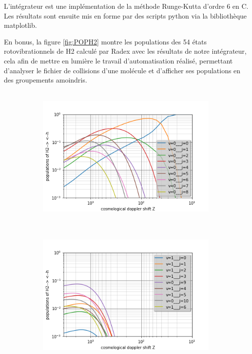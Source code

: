 \documentclass[10pt, a4paper]{report}
\numberwithin{equation}{subsection}
\begin{document}
L'intégrateur est une implémentation de la méthode Runge-Kutta d'ordre 6 en C. Les résultats sont ensuite mis en forme par des scripts python via la bibliothèque matplotlib.

En bonus, la figure \ref{fig:POPH2} montre les populations des 54 états rotovibrationnels de H2 calculé par Radex avec les résultats de notre intégrateur, cela afin de mettre en lumière le travail d'automatisation réalisé, permettant d'analyser le fichier de collisions d'une molécule et d'afficher ses populations en des groupements amoindris.

\begin{figure}[]

\begin{subfigure}{0.5\textwidth}
\centering
\includegraphics[width=9cm,height=7cm]{levelsh2-h.0.png}
\end{subfigure}
\begin{subfigure}{0.5\textwidth}
\centering
\includegraphics[width=9cm,height=7cm]{levelsh2-h.1.png}
\end{subfigure}
\begin{subfigure}{0.5\textwidth}

\end{subfigure}
\end{figure}
\end{document}
